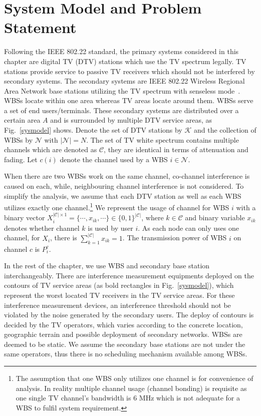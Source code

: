 \section{System Model and Problem Statement}
\label{SystemModel}
Following the IEEE 802.22 standard, the primary systems considered in this chapter are digital TV (\gls{DTV}) stations which use the TV spectrum legally. 
TV stations provide service to passive TV receivers which should not be interfered by secondary systems. 
The secondary systems are IEEE 802.22 Wireless Regional Area Network base stations utilizing the TV spectrum with senseless mode~\cite{SenseLess2011}. 
WBSs locate within one area whereas TV areas locate around them. 
WBSs serve a set of end users/terminals.
These secondary systems are distributed over a certain area $A$ and is surrounded by multiple DTV service areas, as Fig.~\ref{sysmodel} shows. 
Denote the set of DTV stations by $\mathcal{K}$ and the collection of WBSs by $\mathcal{N}$ with $| \mathcal{N}|=N$. 
The set of TV white spectrum contains multiple channels which are denoted as $\mathcal{C}$, they are identical in terms of attenuation and fading.
Let $c(i)$ denote the channel used by a WBS $i\in \mathcal{N}$. 

When there are two WBSs work on the same channel, co-channel interference is caused on each, while, neighbouring channel interference is not considered. 
To simplify the analysis, we assume that each DTV station as well as each WBS utilizes exactly one channel.\footnote{The assumption that one WBS only utilizes one channel is for convenience of analysis. 
In reality multiple channel usage (channel bonding) is requisite as one single TV channel's bandwidth is 6 MHz which is not adequate for a WBS to fulfil system requirement. 
}
We represent the usage of channel for WBS $i$ with a binary vector $X_i^{|\mathcal{C}|\times 1}=\{\cdots, x_{ik}, \cdots\}\in \{0,1\}^{|\mathcal{C}|}$, where $k\in \mathcal{C}$ and binary variable $x_{ik}$ denotes whether channel $k$ is used by user $i$. 
As each node can only uses one channel, for $X_i$, there is $\sum_{k=1}^{|\mathcal{C}|}x_{ik}=1$. 
The transmission power of WBS $i$ on channel $c$ is $P_i^c$. 


In the rest of the chapter, we use WBS and secondary base station interchangeably. 
There are interference measurement equipments deployed on the contours of TV service areas (as bold rectangles in Fig.~\ref{sysmodel}), which represent the worst located TV receivers in the TV service areas. 
For these interference measurement devices, an interference threshold should not be violated by the noise generated by the secondary users.
The deploy of contours is decided by the TV operators, which varies according to the concrete location, geographic terrain and possible deployment of secondary networks. 
WBSs are deemed to be static.
We assume the secondary base stations are not under the same operators, thus there is no scheduling mechanism available among WBSs.



